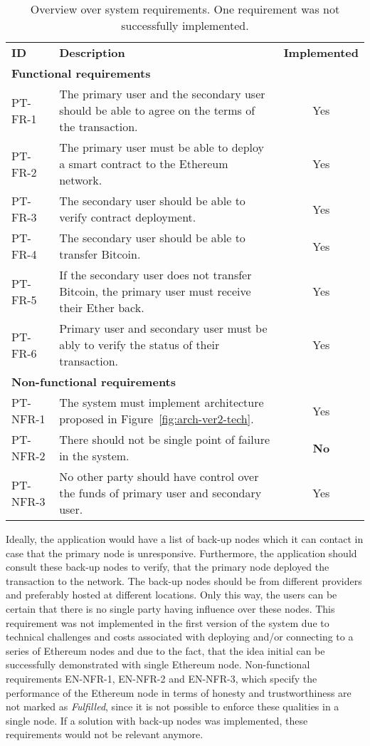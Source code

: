\begin{table}[ht]
    \centering
    \begin{tabularx}{\textwidth}{|l X c|}
    \hline
    \textbf{ID}&\textbf{Description}&\textbf{Implemented}\\
    \multicolumn{3}{|l|}{\textbf{Functional requirements}}\\
    PT-FR-1 & The primary user and the secondary user should be able to agree on the terms of the transaction.&Yes\\
    PT-FR-2 & The primary user must be able to deploy a smart contract to the Ethereum network.&Yes\\
    PT-FR-3 & The secondary user should be able to verify contract deployment.&Yes\\
    PT-FR-4 & The secondary user should be able to transfer Bitcoin.&Yes\\
    PT-FR-5 & If the secondary user does not transfer Bitcoin, the primary user must receive their Ether back.&Yes\\
    PT-FR-6 & Primary user and secondary user must be ably to verify the status of their transaction.&Yes\\
    \multicolumn{3}{|l|}{\textbf{Non-functional requirements}}\\
    PT-NFR-1&The system must implement architecture proposed in Figure~\ref{fig:arch-ver2-tech}.&Yes\\
    PT-NFR-2&There should not be single point of failure in the system.&\textbf{No}\\
    PT-NFR-3&No other party should have control over the funds of primary user and secondary user.&Yes\\
    \hline
    \end{tabularx}
    \caption{Overview over system requirements. One requirement was not successfully implemented.}
    \label{tab:system-reqs-eval}
\end{table}

Ideally, the application would have a list of back-up nodes which it can contact in case that the primary node is unresponsive. Furthermore, the application should consult these back-up nodes to verify, that the primary node deployed the transaction to the network. The back-up nodes should be from different providers and preferably hosted at different locations. Only this way, the users can be certain that there is no single party having influence over these nodes. This requirement was not implemented in the first version of the system due to technical challenges and costs associated with deploying and/or connecting to a series of Ethereum nodes and due to the fact, that the idea initial can be successfully demonstrated with single Ethereum node. Non-functional requirements EN-NFR-1, EN-NFR-2 and EN-NFR-3, which specify the performance of the Ethereum node in terms of honesty and trustworthiness are not marked as \textit{Fulfilled}, since it is not possible to enforce these qualities in a single node. If a solution with back-up nodes was implemented, these requirements would not be relevant anymore.

